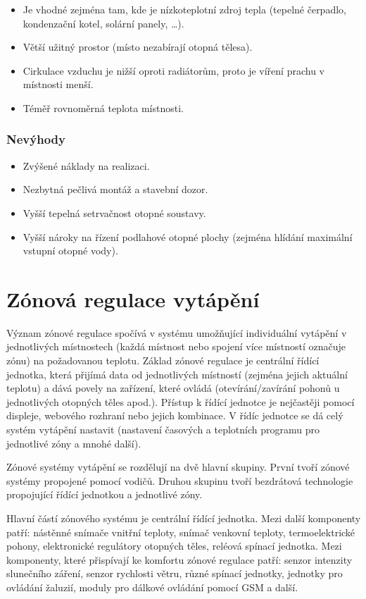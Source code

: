 \begin{itemize}
  \item Je vhodné zejména tam, kde je nízkoteplotní zdroj tepla (tepelné čerpadlo, kondenzační kotel, solární panely, …).
  \item Větší užitný prostor (místo nezabírají otopná tělesa).
  \item Cirkulace vzduchu je nižší oproti radiátorům, proto je víření prachu v místnosti menší.
  \item Téměř rovnoměrná teplota místnosti.
\end{itemize}

\subsubsection{Nevýhody}

\begin{itemize}
  \item Zvýšené náklady na realizaci.
  \item Nezbytná pečlivá montáž a stavební dozor.
  \item Vyšší tepelná setrvačnost otopné soustavy.
  \item Vyšší nároky na řízení podlahové otopné plochy (zejména hlídání maximální vstupní otopné vody).
\end{itemize}


\section{Zónová regulace vytápění}

Význam zónové regulace spočívá v systému umožňující individuální vytápění v jednotlivých místnostech (každá místnost nebo spojení více místností označuje zónu) na požadovanou teplotu.  Základ zónové regulace je centrální řídící jednotka, která přijímá data od jednotlivých místností (zejména jejich aktuální teplotu) a dává povely na zařízení, které ovládá (otevírání/zavírání pohonů u jednotlivých otopných těles apod.). Přístup k řídící jednotce je nejčastěji pomocí displeje, webového rozhraní nebo jejich kombinace. V řídíc jednotce se dá celý systém vytápění nastavit (nastavení časových a teplotních programu pro jednotlivé zóny a mnohé další). 

Zónové systémy vytápění se rozdělují na dvě hlavní skupiny. První tvoří zónové systémy propojené pomocí vodičů. Druhou skupinu tvoří bezdrátová technologie propojující řídící jednotkou a jednotlivé zóny. 

Hlavní částí zónového systému je centrální řídící jednotka. Mezi další komponenty patří: nástěnné snímače vnitřní teploty, snímač venkovní teploty, termoelektrické pohony, elektronické regulátory otopných těles, reléová spínací jednotka. Mezi komponenty, které přispívají ke komfortu zónové regulace patří: senzor intenzity slunečního záření, senzor rychlosti větru, různé spínací jednotky, jednotky pro ovládání žaluzií, moduly pro dálkové ovládání pomocí GSM a další.
